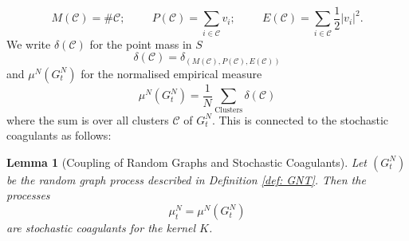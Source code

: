 \documentclass[11pt, notitlepage]{article}
\newtheorem{lem}[thm]{Lemma}
\begin{document}
\begin{equation}
   M(\mathcal{C})=\#\mathcal{C}; \hspace{1cm} P(\mathcal{C})=\sum_{i\in \mathcal{C}} v_i;\hspace{1cm} E(\mathcal{C})=\sum_{i\in \mathcal{C}} \frac{1}{2}|v_i|^2.
\end{equation} We write $\delta(\mathcal{C})$ for the point mass in $S$ \begin{equation}
    \delta(\mathcal{C})=\delta_{(M(\mathcal{C}),P(\mathcal{C}),E(\mathcal{C}))}
\end{equation} and $\mu^N(G^N_t)$ for the normalised empirical measure \begin{equation} \mu^N(G^N_t)=\frac{1}{N}\sum_\text{Clusters} \delta(\mathcal{C})\end{equation} where the sum is over all clusters $\mathcal{C}$ of $G^N_t$. This is connected to the stochastic coagulants as follows:
\begin{lem}[Coupling of Random Graphs and Stochastic Coagulants]\label{lemma: coupling} Let $(G^N_t)$ be the random graph process described in Definition \ref{def: GNT}. Then the processes \begin{equation}
    \mu^N_t=\mu^N(G^N_t)
\end{equation} are stochastic coagulants for the kernel $K$.
\end{lem}
\end{document}
